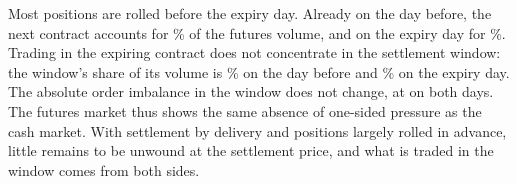 \begin{table}[htbp]
\centering
\small
\caption{Stock futures on the expiry day and the day before, twelve monthly expiries,
averaged over security-months. The share of futures volume is the contract's share of
the security's volume in its two nearest contracts. Order imbalance is
$(BI - SI)/(BI + SI)$ over the settlement window, with the aggressor identified as in the cash
market. Paired $p$-values in brackets.}
\label{tab:futtape}

\end{table}

Most positions are rolled before the expiry day. Already on the day before, the next contract
accounts for \FuttapeNextContractshareControl{}\% of the futures volume, and on the expiry day
for \FuttapeNextContractshareExpiry{}\%. Trading in the expiring contract does not concentrate in
the settlement window: the window's share of its volume is \FuttapeNearShareControl{}\% on the
day before and \FuttapeNearShareExpiry{}\% on the expiry day. The absolute order imbalance in the
window does not change, at \FuttapeNearAbsoibControl{} on both days. The futures market thus
shows the same absence of one-sided pressure as the cash market. With settlement by delivery
and positions largely rolled in advance, little remains to be unwound at the settlement price,
and what is traded in the window comes from both sides.

